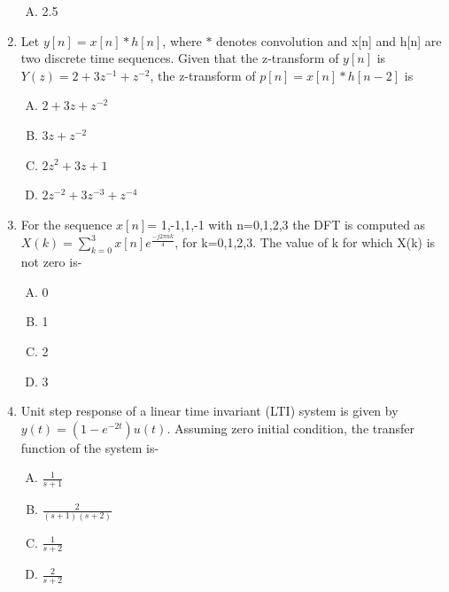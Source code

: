 \documentclass[journal,12pt,twocolumn]{IEEEtran}
\begin{document}
\begin{enumerate}
\begin{enumerate}[(A)]
\item 2.5
\end{enumerate}
\item Let $y[n]=x[n]*h[n]$, where $*$ denotes convolution and x[n] and h[n] are two discrete time sequences. Given that the z-transform of $y[n]$ is $Y(z)=2+3z^{-1}+z^{-2}$, the z-transform of $p[n]=x[n]*h[n-2]$ is
\begin{enumerate}[(A)]

\setlength\itemsep{0.5em}

\item $2+3z+z^{-2}$
\item $3z+z^{-2}$

\item $2z^{2}+3z+1$

\item $2z^{-2}+3z^{-3}+z^{-4}$
\end{enumerate}
\item For the sequence $x[n]$= {1,-1,1,-1} with n=0,1,2,3 the DFT is computed as $X(k)=\sum _{k=0 }^{3} x[n]e^{\frac{-j2\pi nk}{4}} $, for k=0,1,2,3. The value of k for which X(k) is not zero is-
\begin{enumerate}[(A)]

\setlength\itemsep{0.5em}

\item 0
\item 1

\item 2

\item 3
\end{enumerate}

\item Unit step response of a linear time invariant (LTI) system is given by $y(t)=(1-e^{-2t})u(t)$. Assuming zero initial condition, the transfer function of the system is-
\begin{enumerate}[(A)]

\setlength\itemsep{0.5em}

\item $\frac{1}{s+1}$
\item $\frac{2}{(s+1)(s+2)}$

\item $\frac{1}{s+2}$

\item $\frac{2}{s+2}$
\end{enumerate}


\end{enumerate}
\end{document}
